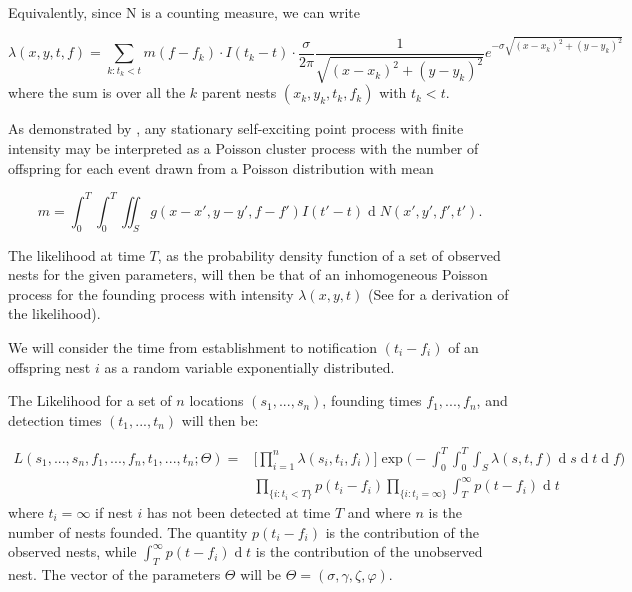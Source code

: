 \documentclass[11pt,a4paper]{article}
\renewcommand{\d}[1]{\ensuremath{\operatorname{d}\!{#1}}}
\begin{document}
{\color{red} Equivalently, since N is a counting measure, we can write

\[
\lambda(x, y, t, f) = \sum_{ k: t_k < t } m(f - f_k) \cdot I(t_k - t)\cdot \frac{\sigma}{2 \pi} \frac{1}{\sqrt{(x - x_k)^{2} + (y - y_k)^{2}}} e^{- \sigma \sqrt{(x - x_k)^{2} + (y - y_k)^{2}}}
\]
where the sum is over all the $k$ parent nests $(x_k, y_k, t_k, f_k)$ with $t_k < t$.

As demonstrated by \cite{Hawkes74}, any stationary self-exciting point process with finite intensity may be interpreted as a Poisson cluster process with the number of offspring for each event drawn from a Poisson distribution with mean 

\begin{equation} \label{eq:NumOffsp}
    m = \int_0^T \int_0^T \iint_S g(x-x', y-y', f-f') I(t' - t) \d N(x', y', f', t').
\end{equation}}

The likelihood at time $T$, {\color{red}as the probability density function of a set of observed nests for the given parameters,} will then be that of an inhomogeneous Poisson process for the founding process with intensity $\lambda(x, y, t)$ {\color{red} (See \cite{Reinhart} for a derivation of the likelihood).}

We will consider the time from establishment to notification $(t_i - f_i)$ of an offspring nest $i$ as a random variable exponentially distributed.

The Likelihood for a set of $n$ locations $(s_{1}, ... , s_{n})$, founding times $f_{1}, ... , f_{n}$, and detection times $(t_{1},  ... , t_{n})$ will then be:

\begin{equation*}
\begin{aligned}
L(s_{1}, ..., s_{n}, f_{1}, ..., f_{n}, t_{1}, ..., t_{n} ; \Theta) = & \Bigg[ \prod_{i = 1}^{n} \lambda(s_{i}, t_{i}, f_{i}) \Bigg] \exp \Bigg(- \int_{0}^{T} \int_{0}^{T} \int_{S} \lambda(s, t, f) \d s \d t \d f \Bigg) \\ 
& \prod_{\{ i : t_{i} < T \} } p(t_{i} - f_{i}) \prod_{ \{ i : t_{i} = \infty \} } \int_{T}^{\infty} p(t - f_{i}) \d t
\end{aligned}
\end{equation*}
where $t_{i} = \infty$ if nest $i$ has not been detected at time $T$ and where $n$ is the number of nests founded. The quantity $p(t_{i} - f_{i})$ is the contribution of the observed nests, while $\int_{T}^{\infty} p(t - f_{i}) \d t$ is the contribution of the unobserved nest. The vector of the parameters $\Theta$ will be $\Theta = ( \sigma, \gamma, \zeta, \varphi)$.
\end{document}
